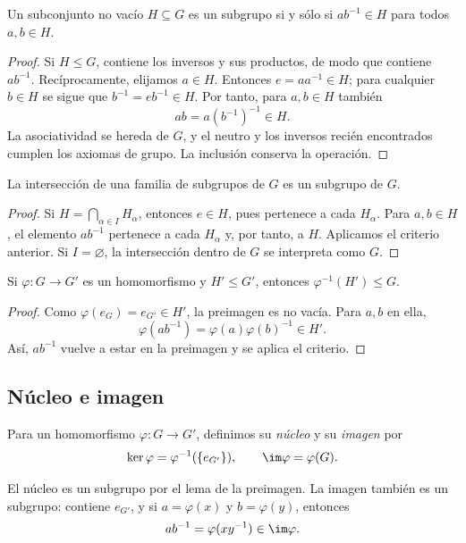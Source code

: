 \begin{prop}\label{prop:C4-criterio}
Un subconjunto no vacío $H\subseteq G$ es un subgrupo si y sólo si $ab^{-1}\in H$ para todos $a,b\in H$.
\end{prop}
\begin{proof}
Si $H\le G$, contiene los inversos y sus productos, de modo que contiene $ab^{-1}$. Recíprocamente, elijamos $a\in H$. Entonces $e=aa^{-1}\in H$; para cualquier $b\in H$ se sigue que $b^{-1}=eb^{-1}\in H$. Por tanto, para $a,b\in H$ también
\[
ab=a(b^{-1})^{-1}\in H.
\]
La asociatividad se hereda de $G$, y el neutro y los inversos recién encontrados cumplen los axiomas de grupo. La inclusión conserva la operación.
\end{proof}

\begin{lema}\label{lema:C4-interseccion}
La intersección de una familia de subgrupos de $G$ es un subgrupo de $G$.
\end{lema}
\begin{proof}
Si $H=\bigcap_{\alpha\in I}H_\alpha$, entonces $e\in H$, pues pertenece a cada $H_\alpha$. Para $a,b\in H$, el elemento $ab^{-1}$ pertenece a cada $H_\alpha$ y, por tanto, a $H$. Aplicamos el criterio anterior. Si $I=\varnothing$, la intersección dentro de $G$ se interpreta como $G$.
\end{proof}

\begin{lema}\label{lema:C4-preimagen}
Si $\varphi:G\to G'$ es un homomorfismo y $H'\le G'$, entonces $\varphi^{-1}(H')\le G$.
\end{lema}
\begin{proof}
Como $\varphi(e_G)=e_{G'}\in H'$, la preimagen es no vacía. Para $a,b$ en ella,
\[
\varphi(ab^{-1})=\varphi(a)\varphi(b)^{-1}\in H'.
\]
Así, $ab^{-1}$ vuelve a estar en la preimagen y se aplica el criterio.
\end{proof}

\subsection{Núcleo e imagen}
\begin{defi}
Para un homomorfismo $\varphi:G\to G'$, definimos su \emph{núcleo} y su \emph{imagen} por
\[
\ker\varphi=\varphi^{-1}(\{e_{G'}\}),\qquad
\im\varphi=\varphi(G).
\]
\end{defi}
El núcleo es un subgrupo por el lema de la preimagen. La imagen también es un subgrupo: contiene $e_{G'}$, y si $a=\varphi(x)$ y $b=\varphi(y)$, entonces
\[
ab^{-1}=\varphi(xy^{-1})\in\im\varphi.
\]

